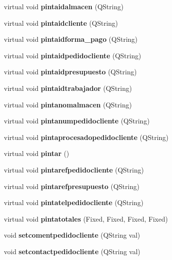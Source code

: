 \begin{CompactItemize}
\item 
virtual void {\bf pintaidalmacen} (QString)\label{classPedidoCliente_a14}

\item 
virtual void {\bf pintaidcliente} (QString)\label{classPedidoCliente_a15}

\item 
virtual void {\bf pintaidforma\_\-pago} (QString)\label{classPedidoCliente_a16}

\item 
virtual void {\bf pintaidpedidocliente} (QString)\label{classPedidoCliente_a17}

\item 
virtual void {\bf pintaidpresupuesto} (QString)\label{classPedidoCliente_a18}

\item 
virtual void {\bf pintaidtrabajador} (QString)\label{classPedidoCliente_a19}

\item 
virtual void {\bf pintanomalmacen} (QString)\label{classPedidoCliente_a20}

\item 
virtual void {\bf pintanumpedidocliente} (QString)\label{classPedidoCliente_a21}

\item 
virtual void {\bf pintaprocesadopedidocliente} (QString)\label{classPedidoCliente_a22}

\item 
virtual void {\bf pintar} ()\label{classPedidoCliente_a23}

\item 
virtual void {\bf pintarefpedidocliente} (QString)\label{classPedidoCliente_a24}

\item 
virtual void {\bf pintarefpresupuesto} (QString)\label{classPedidoCliente_a25}

\item 
virtual void {\bf pintatelpedidocliente} (QString)\label{classPedidoCliente_a26}

\item 
virtual void {\bf pintatotales} (Fixed, Fixed, Fixed, Fixed)\label{classPedidoCliente_a27}

\item 
void {\bf setcomentpedidocliente} (QString val)\label{classPedidoCliente_a28}

\item 
void {\bf setcontactpedidocliente} (QString val)\label{classPedidoCliente_a29}


\end{CompactItemize}
